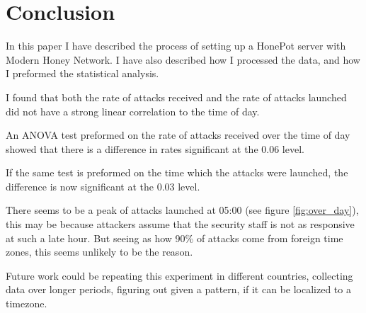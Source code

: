 \section{Conclusion}
\label{sec:conclusion}

In this paper I have described the process of setting up a HonePot
server with Modern Honey Network. I have also described how I 
processed the data, and how I preformed the statistical analysis.


I found that both the rate of attacks received and the rate 
of attacks launched did not have a strong linear correlation
to the time of day. 


An ANOVA test preformed on the rate of attacks received over 
the time of day showed that there is a difference in rates
significant at the 0.06 level.


If the same test is preformed on the
 time which the attacks
were launched, the difference is now significant at the 0.03
level.


There seems to be a peak of attacks launched at 
05:00 (see figure \ref{fig:over_day}), this may be 
because attackers assume that the security staff is 
not as responsive at such a late hour. But seeing as
how 90\% of attacks come from foreign time zones, this 
seems unlikely to be the reason.


Future work could be repeating this experiment in different
countries, collecting data over longer periods, figuring out
given a pattern, if it can be localized to a timezone.